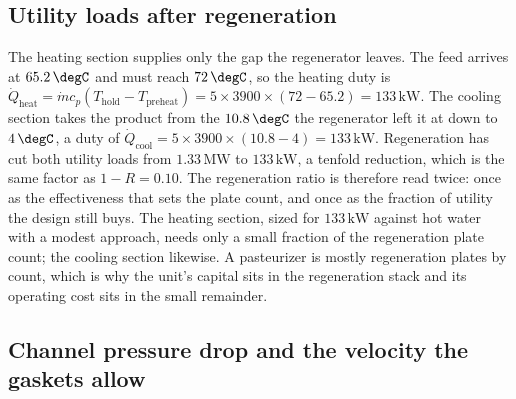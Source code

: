 \subsection{Utility loads after regeneration}

The heating section supplies only the gap the regenerator leaves. The feed
arrives at $65.2\,\degC$ and must reach $72\,\degC$, so the heating duty is
$\dot{Q}_{\text{heat}} = \dot{m} c_p (T_{\text{hold}} - T_{\text{preheat}}) =
5\times 3900\times (72 - 65.2) = 133\,\text{kW}$. The cooling section takes the
product from the $10.8\,\degC$ the regenerator left it at down to $4\,\degC$,
a duty of $\dot{Q}_{\text{cool}} = 5\times 3900\times (10.8 - 4) = 133\,\text{
kW}$. Regeneration has cut both utility loads from $1.33\,\text{MW}$ to
$133\,\text{kW}$, a tenfold reduction, which is the same factor as $1 - R =
0.10$. The regeneration ratio is therefore read twice: once as the effectiveness
that sets the plate count, and once as the fraction of utility the design still
buys. The heating section, sized for $133\,\text{kW}$ against hot water with a
modest approach, needs only a small fraction of the regeneration plate count;
the cooling section likewise. A pasteurizer is mostly regeneration plates by
count, which is why the unit's capital sits in the regeneration stack and its
operating cost sits in the small remainder.

\subsection{Channel pressure drop and the velocity the gaskets allow}

